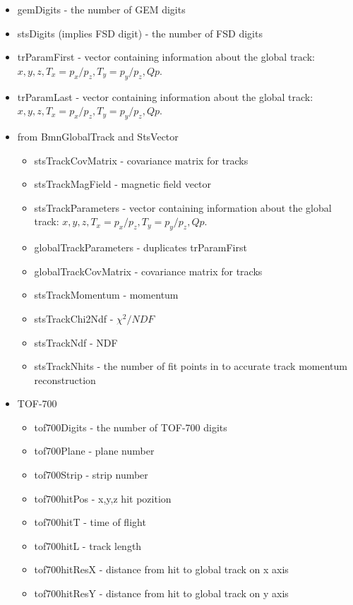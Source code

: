 \begin{itemize}
\begin{itemize}
        \end{itemize}
    \item gemDigits - the number of GEM digits
    \item stsDigits (implies FSD digit) - the number of FSD digits
    \item trParamFirst - vector containing information about the global track: $x,y,z, T_x=p_x/p_z, T_y=p_y/p_z, Qp$.
    \item trParamLast - vector containing information about the global track: $x,y,z, T_x=p_x/p_z, T_y=p_y/p_z, Qp$.
    \item from BmnGlobalTrack and StsVector
        \begin{itemize}
            \item stsTrackCovMatrix - covariance matrix for tracks
            \item stsTrackMagField - magnetic field vector
            \item stsTrackParameters - vector containing information about the global track: $x,y,z, T_x=p_x/p_z, T_y=p_y/p_z, Qp$.
            \item globalTrackParameters - duplicates trParamFirst
            \item globalTrackCovMatrix - covariance matrix for tracks
            \item stsTrackMomentum - momentum 
            \item stsTrackChi2Ndf - $\chi^{2}/NDF$
            \item stsTrackNdf - NDF
            \item stsTrackNhits - the number of fit points in to accurate track momentum reconstruction
        \end{itemize}
    \item TOF-700
        \begin{itemize}
            \item tof700Digits - the number of TOF-700 digits
            \item tof700Plane - plane number
            \item tof700Strip - strip number
            \item tof700hitPos - x,y,z hit pozition
            \item tof700hitT - time of flight
            \item tof700hitL - track length
            \item tof700hitResX - distance from hit to global track on x axis
            \item tof700hitResY - distance from hit to global track on y axis

\end{itemize}
\end{itemize}
